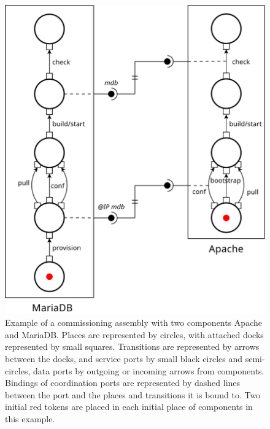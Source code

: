 \begin{figure}[tbp]
  \begin{center}
    \includegraphics[width=0.7\linewidth]{./images/apachebdd.pdf}
  \end{center}
  \caption{Example of a \mad commissioning assembly with two components
    Apache and MariaDB. Places are represented by circles, with attached
    docks represented by small squares. Transitions are represented
    by arrows between the docks, and service ports by small black circles and
    semi-circles, data ports by outgoing or incoming arrows from
    components. Bindings of coordination ports are represented by dashed lines between the port and the places and transitions it is bound to. Two initial red tokens are placed in each initial
    place of components in this example.}
  \label{fig:example}
\end{figure}


